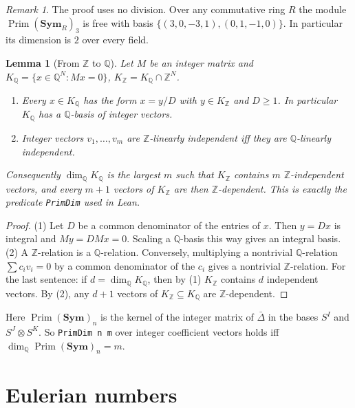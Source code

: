 \documentclass[11pt]{article}
\newtheorem{lemma}[theorem]{Lemma}
\theoremstyle{remark}
\newtheorem{remark}[theorem]{Remark}
\newcommand{\NSym}{\mathbf{Sym}}
\newcommand{\Prim}{\operatorname{Prim}}
\begin{document}
\begin{remark}\label{rem:ring}
The proof uses no division. Over any commutative ring $R$ the module $\Prim(\NSym_R)_3$
is free with basis $\{(3,0,-3,1),(0,1,-1,0)\}$. In particular its dimension is $2$
over every field.
\end{remark}

\begin{lemma}[From $\mathbb Z$ to $\mathbb Q$]\label{lem:ZQ}
Let $M$ be an integer matrix and $K_{\mathbb Q}=\{x\in\mathbb Q^N:Mx=0\}$,
$K_{\mathbb Z}=K_{\mathbb Q}\cap\mathbb Z^N$.
\begin{enumerate}
\item Every $x\in K_{\mathbb Q}$ has the form $x=y/D$ with $y\in K_{\mathbb Z}$ and $D\ge1$.
In particular $K_{\mathbb Q}$ has a $\mathbb Q$-basis of integer vectors.
\item Integer vectors $v_1,\dots,v_m$ are $\mathbb Z$-linearly independent iff they are
$\mathbb Q$-linearly independent.
\end{enumerate}
Consequently $\dim_{\mathbb Q}K_{\mathbb Q}$ is the largest $m$ such that $K_{\mathbb Z}$
contains $m$ $\mathbb Z$-independent vectors, and every $m+1$ vectors of $K_{\mathbb Z}$ are
then $\mathbb Z$-dependent. This is exactly the predicate \texttt{PrimDim} used in Lean.
\end{lemma}
\begin{proof}
(1) Let $D$ be a common denominator of the entries of $x$. Then $y=Dx$ is integral and
$My=DMx=0$. Scaling a $\mathbb Q$-basis this way gives an integral basis.
(2) A $\mathbb Z$-relation is a $\mathbb Q$-relation. Conversely, multiplying a nontrivial
$\mathbb Q$-relation $\sum c_iv_i=0$ by a common denominator of the $c_i$ gives a nontrivial
$\mathbb Z$-relation. For the last sentence: if $d=\dim_{\mathbb Q}K_{\mathbb Q}$, then by (1)
$K_{\mathbb Z}$ contains $d$ independent vectors. By (2), any $d+1$ vectors of
$K_{\mathbb Z}\subseteq K_{\mathbb Q}$ are $\mathbb Z$-dependent.
\end{proof}
Here $\Prim(\NSym)_n$ is the kernel of the integer matrix of $\bar\Delta$ in the bases
$S^I$ and $S^J\otimes S^K$. So \texttt{PrimDim n m} over integer coefficient vectors holds
iff $\dim_{\mathbb Q}\Prim(\NSym)_n=m$.

\section{Eulerian numbers}\label{sec:euler}
\end{document}
